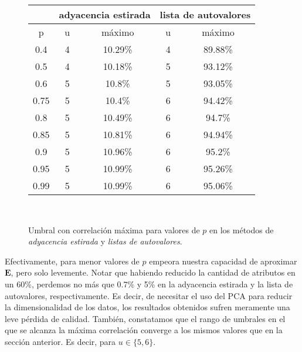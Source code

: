 \vspace{1em}
\begin{figure}[!htbp]
    \begin{tabular}{ c|c|c|c|c } 
    \hline
     & \multicolumn{2}{c}{adyacencia estirada} & \multicolumn{2}{c}{lista de autovalores} \\
    \hline
    p & u & máximo & u & máximo \\
    \hline
    0.4            &4       &10.29\%                 & 4    &89.88\%  \\
    0.5            &4       &10.18\%             & 5    &93.12\%  \\
    0.6            &5       &10.8\%                & 5     &93.05\%      \\
    0.75            &5      &10.4\%              & 6    &94.42\%     \\
    0.8            &5       &10.49\%             & 6    &94.7\%      \\
    0.85            &5      &10.81\%              & 6       &94.94\% \\
    0.9            &5       &10.96\%             & 6    &95.2\%  \\
    0.95            &5      &10.99\%              & 6      &95.26\% \\
    0.99            &5      &10.99\%               & 6      &95.06\% \\
    \hline
    \end{tabular} \\
    \bigskip
    \caption{Umbral con correlación máxima para valores de $p$ en los métodos de \textit{adyacencia estirada} y \textit{listas de autovalores}.} \label{tabla_correlaciones_pca}
\end{figure}

Efectivamente, para menor valores de $p$ empeora nuestra capacidad de aproximar $\textbf{E}$, pero solo levemente.
Notar que habiendo reducido la cantidad de atributos en un 60\%, perdemos no más que 0.7\% y 5\% en la adyacencia estirada y la lista de autovalores, respectivamente.
Es decir, de necesitar el uso del PCA para reducir la dimensionalidad de los datos, los resultados obtenidos sufren meramente una leve pérdida de calidad.
También, constatamos que el rango de umbrales en el que se alcanza la máxima correlación converge a los mismos valores que en la sección anterior.
Es decir, para $u \in \{5, 6\}$.
